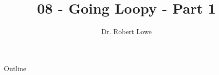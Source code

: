 \documentclass[]{beamer}
\title{08 - Going Loopy - Part 1}
\author{Dr. Robert Lowe\\}
\institute[Maryville College] %
{
  Division of Mathematics and Computer Science\\
  Maryville College
}
\date[]{}
\begin{document}
\begin{frame}
  \titlepage
\end{frame}

\begin{frame}{Outline}
  \tableofcontents
\end{frame}




\end{document}
